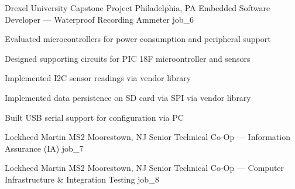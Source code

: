 \documentclass[10pt]{barag_resume}
\begin{document}
    \begin{job}{Drexel University Capstone Project}
        {Philadelphia, PA}
        {Embedded Software Developer --- Waterproof Recording Ammeter}
        {job_6}
            \begin{itemize*}
                \item Evaluated microcontrollers for power consumption and peripheral support
                \item Designed supporting circuits for PIC 18F microontroller and sensors
                \item Implemented I2C sensor readings via vendor library
                \item Implemented data persistence on SD card via SPI via vendor library
                \item Built USB serial support for configuration via PC
            \end{itemize*}
    \end{job}

    \begin{job}{Lockheed Martin MS2}
        {Moorestown, NJ}
        {Senior Technical Co-Op --- Information Assurance (IA)}
        {job_7}
    \end{job}

    \begin{job}{Lockheed Martin MS2}
        {Moorestown, NJ}
        {Senior Technical Co-Op --- Computer Infrastructure \& Integration Testing}
        {job_8}
    \end{job}
\end{document}

